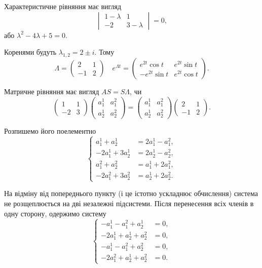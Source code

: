 \begin{solution}
    Характеристичне рівняння має вигляд
    \[ \begin{vmatrix}
        1 - \lambda & 1 \\
        -2 & 3 - \lambda 
    \end{vmatrix} = 0, \]
    або $\lambda^2 - 4 \lambda + 5 = 0$. \parvskip
    
    Коренями будуть $\lambda_{1,2} = 2 \pm i$. Тому 
    \[ \Lambda = \begin{pmatrix} 2 & 1 \\ -1 & 2 \end{pmatrix} \quad e^{\Lambda t} = \begin{pmatrix} e^{2 t} \cos t & e^{2 t} \sin t \\ - e^{2 t} \sin t & e^{2 t} \cos t \end{pmatrix}. \]
    
    Матричне рівняння має вигляд $A S = S \Lambda$, чи
    \[ \begin{pmatrix} 1 & 1 \\ -2 & 3 \end{pmatrix} \begin{pmatrix} a_1^1 & a_1^2 \\ a_2^1 & a_2^2 \end{pmatrix} = \begin{pmatrix} a_1^1 & a_1^2 \\ a_2^1 & a_2^2 \end{pmatrix} \begin{pmatrix} 2 & 1 \\ -1 & 2 \end{pmatrix}. \]
    
    Розпишемо його поелементно
    \[ \left\{ \begin{aligned} 
        a_1^1 + a_2^1 &= 2 a_1^1 - a_1^2, \\
        -2 a_1^1 + 3 a_2^1 &= 2 a_2^1 - a_2^2, \\
        a_1^2 + a_2^2 &= a_1^1 + 2 a_1^2, \\
        -2 a_1^2 + 3 a_2^2 &= a_2^1 + 2 a_2^2.
    \end{aligned} \right.\]
    
    На відміну від попереднього пункту (і це істотно ускладнює обчислення) система не розщеплюється  на дві незалежні підсистеми. Після перенесення всіх членів в одну сторону, одержимо систему
    \[ \left\{ \begin{aligned} 
        - a_1^1 - a_1^2 + a_2^1 &= 0, \\
        -2 a_1^1 + a_2^1 + a_2^2 &= 0, \\
        -a_1^1 - a_1^2 + a_2^2 &= 0, \\
        -2 a_1^2 + a_2^1 + a_2^2 &= 0.
    \end{aligned} \right.\]
     

\end{solution}

